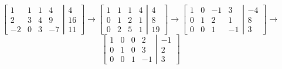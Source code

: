 \documentclass[12pt]{article}
\begin{document}
$$\left[\left.\begin{matrix}
1 & 1 & 1 & 4\\
2 & 3 & 4 & 9\\
-2 & 0 & 3 & -7
\end{matrix}\right|
\begin{matrix}
4\\16\\11
\end{matrix}\right]
\rightarrow
\left[\left.\begin{matrix}
1 & 1 & 1 & 4\\0 & 1 & 2 & 1\\0 & 2 & 5 & 1
\end{matrix}\right|
\begin{matrix}
4\\8\\19
\end{matrix}\right]
\rightarrow
\left[\left.\begin{matrix}
1 & 0 & -1 & 3\\0 & 1 & 2 & 1\\0 & 0 & 1 & -1
\end{matrix}\right|
\begin{matrix}
-4\\8\\3
\end{matrix}\right]
\rightarrow
$$$$
\left[\left.\begin{matrix}
1 & 0 & 0 & 2\\0 & 1 & 0 & 3\\0 & 0 & 1 & -1
\end{matrix}\right|
\begin{matrix}
-1\\2\\3
\end{matrix}\right]
$$\\
\end{document}
